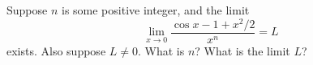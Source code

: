 Suppose $n$ is some positive integer, and the limit
\[
\lim_{x\to0} \frac{\cos x -1 +x^2/2} {x^n} = L
\]
exists. Also suppose $L\neq0$.
What is $n$?  What is the limit $L$?\answercheck
